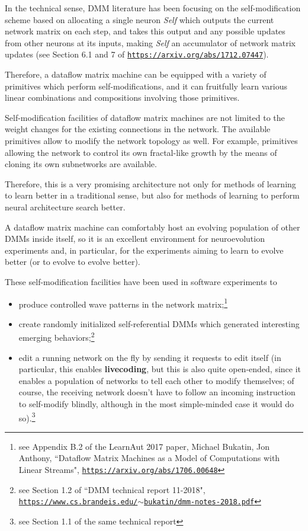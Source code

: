 \documentclass{article}
\begin{document}
In the technical sense, DMM literature has been focusing on the self-modification scheme based on
allocating a single neuron {\em Self} which outputs the current network matrix on each step,
and takes this output and any possible updates from other neurons at its inputs, making {\em Self} an accumulator
of network matrix updates
(see Section 6.1 and 7 of \href{https://arxiv.org/abs/1712.07447}{\tt https://arxiv.org/abs/1712.07447}).

Therefore, a dataflow matrix machine can be equipped with a variety of primitives
which perform self-modifications, and it can fruitfully learn various linear combinations and
compositions involving those primitives.

Self-modification facilities of dataflow matrix machines are not limited to the weight
changes for the existing connections in the network. The available primitives allow to
modify the network topology as well. For example, primitives allowing the network
to control its own fractal-like growth by the means of cloning its own subnetworks
are available.

Therefore, this is a very promising architecture not only for methods of learning to learn
better in a traditional sense, but also for methods of learning to perform
neural architecture search better. 

A dataflow matrix machine can comfortably host
an evolving population of other DMMs inside itself, so it is
an excellent environment for neuroevolution experiments and, in particular,
for the experiments aiming to learn to evolve better (or to evolve to evolve better).

\vspace{0.1in}
\noindent
These self-modification facilities have been used in software experiments to

  \begin{itemize}
     \item produce controlled wave patterns in the network matrix;\footnote{see Appendix B.2 of the LearnAut 2017 paper, Michael Bukatin, Jon Anthony, ``Dataflow Matrix Machines as a Model of Computations with Linear Streams", 
\href{https://arxiv.org/abs/1706.00648}{\tt https://arxiv.org/abs/1706.00648}}
     \item create randomly initialized self-referential DMMs which generated interesting emerging behaviors;\footnote{see Section 1.2 of ``DMM technical report 11-2018", \href{https://www.cs.brandeis.edu/~bukatin/dmm-notes-2018.pdf}{\tt https://www.cs.brandeis.edu/$\sim$bukatin/dmm-notes-2018.pdf}}
     \item edit a running network on the fly by sending it requests to edit itself (in particular, this enables {\bf livecoding}, but this is also quite open-ended, since it enables a population of networks to tell each other to modify themselves; of course, the receiving network doesn't have to follow an incoming instruction to self-modify blindly, although in the most simple-minded case it would do so).\footnote{see Section 1.1 of the same technical report}
  \end{itemize}
\end{document}
